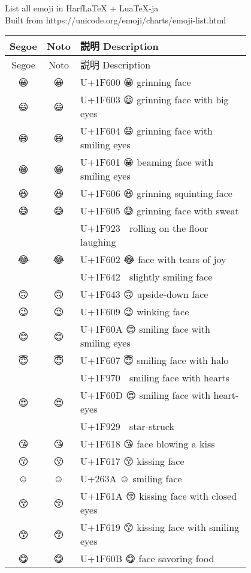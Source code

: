 \documentclass[a4paper,12pt]{ltjarticle}
\newcommand{\fontA}[1]{{\fontspec[RawFeature={mode=harf,+dist,+ccmp}]{Segoe UI Emoji} #1}}
\newcommand{\fontB}[1]{{\fontspec[RawFeature={mode=harf,+dist,+ccmp}]{Noto Color Emoji} #1}}
\begin{document}
\noindent
List all emoji in HarfLaTeX + LuaTeX-ja\\
Built from https://unicode.org/emoji/charts/emoji-list.html

\noindent
\begin{longtable}[c]{ccp{0.8\linewidth}}
Segoe&Noto&説明 Description\\\hline
\endfirsthead  
Segoe&Noto&説明 Description\\\hline
\endhead  
\fontA{😀}&\fontB{😀}&U+1F600 😀 grinning face\\
\fontA{😃}&\fontB{😃}&U+1F603 😃 grinning face with big eyes\\
\fontA{😄}&\fontB{😄}&U+1F604 😄 grinning face with smiling eyes\\
\fontA{😁}&\fontB{😁}&U+1F601 😁 beaming face with smiling eyes\\
\fontA{😆}&\fontB{😆}&U+1F606 😆 grinning squinting face\\
\fontA{😅}&\fontB{😅}&U+1F605 😅 grinning face with sweat\\
\fontA{🤣}&\fontB{🤣}&U+1F923 🤣 rolling on the floor laughing\\
\fontA{😂}&\fontB{😂}&U+1F602 😂 face with tears of joy\\
\fontA{🙂}&\fontB{🙂}&U+1F642 🙂 slightly smiling face\\
\fontA{🙃}&\fontB{🙃}&U+1F643 🙃 upside-down face\\
\fontA{😉}&\fontB{😉}&U+1F609 😉 winking face\\
\fontA{😊}&\fontB{😊}&U+1F60A 😊 smiling face with smiling eyes\\
\fontA{😇}&\fontB{😇}&U+1F607 😇 smiling face with halo\\
\fontA{🥰}&\fontB{🥰}&U+1F970 🥰 smiling face with hearts\\
\fontA{😍}&\fontB{😍}&U+1F60D 😍 smiling face with heart-eyes\\
\fontA{🤩}&\fontB{🤩}&U+1F929 🤩 star-struck\\
\fontA{😘}&\fontB{😘}&U+1F618 😘 face blowing a kiss\\
\fontA{😗}&\fontB{😗}&U+1F617 😗 kissing face\\
\fontA{☺}&\fontB{☺}&U+263A ☺ smiling face\\
\fontA{😚}&\fontB{😚}&U+1F61A 😚 kissing face with closed eyes\\
\fontA{😙}&\fontB{😙}&U+1F619 😙 kissing face with smiling eyes\\
\fontA{😋}&\fontB{😋}&U+1F60B 😋 face savoring food\\

\end{longtable}
\end{document}
